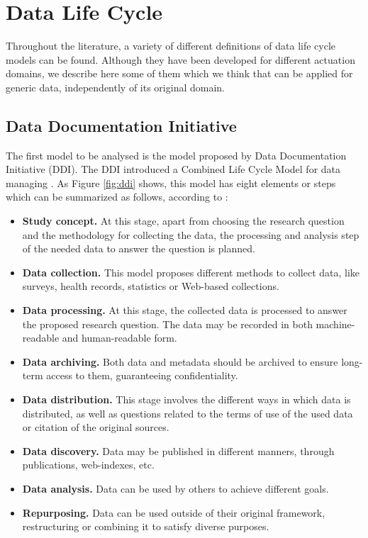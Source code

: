 \section{Data Life Cycle}

Throughout the literature, a variety of different definitions of data life cycle models can be found. Although they have been developed for different actuation domains, we describe here some of them which we think that can be applied for generic data, independently of its original domain.

\subsection{Data Documentation Initiative}

The first model to be analysed is the model proposed by Data Documentation Initiative (DDI). The DDI introduced a Combined Life Cycle Model for data managing \cite{data_documentation_initiative_overview_2008}. As Figure \ref{fig:ddi} shows, this model has eight elements or steps which can be summarized as follows, according to \cite{ball_review_2012}:

\begin{itemize}
    \item \textbf{Study concept.} At this stage, apart from choosing the research question and the methodology for collecting the data, the processing and analysis step of the needed data to answer the question is planned.
    \item \textbf{Data collection.} This model proposes different methods to collect data, like surveys, health records, statistics or Web-based collections.
    \item \textbf{Data processing.} At this stage, the collected data is processed to answer the proposed research question. The data may be recorded in both machine-readable and human-readable form.
    \item \textbf{Data archiving.} Both data and metadata should be archived to ensure long-term access to them, guaranteeing confidentiality.
    \item \textbf{Data distribution.} This stage involves the different ways in which data is distributed, as well as questions related to the terms of use of the used data or citation of the original sources. 
    \item \textbf{Data discovery.} Data may be published in different manners, through publications, web-indexes, etc.
    \item \textbf{Data analysis.} Data can be used by others to achieve different goals.
    \item \textbf{Repurposing.} Data can be used outside of their original framework, restructuring or combining it to satisfy diverse purposes.
\end{itemize}

